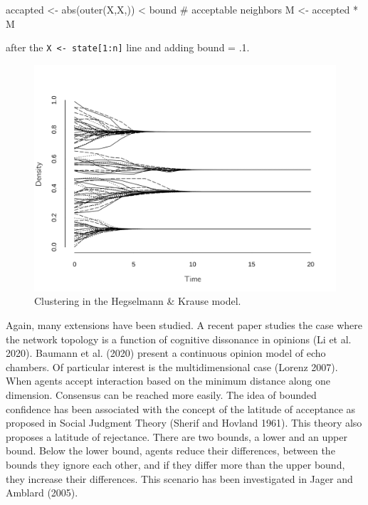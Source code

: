 \documentclass[
  a4paper,
  DIV=11,
  numbers=noendperiod]{scrreprt}
\newenvironment{Shaded}{\begin{snugshade}}{\end{snugshade}}
\newcommand{\CommentTok}[1]{\textcolor[rgb]{0.37,0.37,0.37}{#1}}
\newcommand{\FunctionTok}[1]{\textcolor[rgb]{0.28,0.35,0.67}{#1}}
\newcommand{\NormalTok}[1]{\textcolor[rgb]{0.00,0.23,0.31}{#1}}
\newcommand{\OtherTok}[1]{\textcolor[rgb]{0.00,0.23,0.31}{#1}}
\newcommand{\SpecialCharTok}[1]{\textcolor[rgb]{0.37,0.37,0.37}{#1}}
\newcommand{\StringTok}[1]{\textcolor[rgb]{0.13,0.47,0.30}{#1}}
\begin{document}
\begin{Shaded}
\begin{Highlighting}[]
\NormalTok{accapted }\OtherTok{\textless{}{-}} \FunctionTok{abs}\NormalTok{(}\FunctionTok{outer}\NormalTok{(X,X,}\StringTok{\textquotesingle{}{-}\textquotesingle{}}\NormalTok{)) }\SpecialCharTok{\textless{}}\NormalTok{ bound }\CommentTok{\# acceptable neighbors}
\NormalTok{M }\OtherTok{\textless{}{-}}\NormalTok{ accepted }\SpecialCharTok{*}\NormalTok{ M}
\end{Highlighting}
\end{Shaded}

after the \texttt{X\ \textless{}-\ state{[}1:n{]}} line and adding bound
= .1.

\begin{figure}

{\centering \includegraphics{media/ch7/fig-ch7-img9-old-97.png}

}

\caption{\label{fig-ch7-img9-old-97}Clustering in the Hegselmann \&
Krause model.}

\end{figure}

Again, many extensions have been studied. A recent paper studies the
case where the network topology is a function of cognitive dissonance in
opinions (Li et al. 2020). Baumann et al. (2020) present a continuous
opinion model of echo chambers. Of particular interest is the
multidimensional case (Lorenz 2007). When agents accept interaction
based on the minimum distance along one dimension. Consensus can be
reached more easily. The idea of bounded confidence has been associated
with the concept of the latitude of acceptance as proposed in Social
Judgment Theory (Sherif and Hovland 1961). This theory also proposes a
latitude of rejectance. There are two bounds, a lower and an upper
bound. Below the lower bound, agents reduce their differences, between
the bounds they ignore each other, and if they differ more than the
upper bound, they increase their differences. This scenario has been
investigated in Jager and Amblard (2005).
\end{document}
